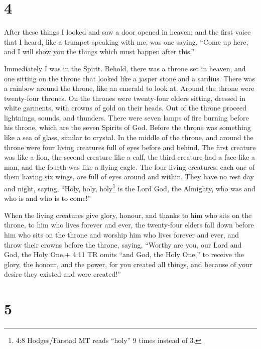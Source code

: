 \hypertarget{section-3}{%
\section{4}\label{section-3}}

 After these things I looked and saw a door opened in
heaven; and the first voice that I heard, like a trumpet speaking with
me, was one saying, ``Come up here, and I will show you the things which
must happen after this.''

 Immediately I was in the Spirit. Behold, there was a throne
set in heaven, and one sitting on the throne  that looked
like a jasper stone and a sardius. There was a rainbow around the
throne, like an emerald to look at.  Around the throne were
twenty-four thrones. On the thrones were twenty-four elders sitting,
dressed in white garments, with crowns of gold on their heads.
 Out of the throne proceed lightnings, sounds, and thunders.
There were seven lamps of fire burning before his throne, which are the
seven Spirits of God.  Before the throne was something like
a sea of glass, similar to crystal. In the middle of the throne, and
around the throne were four living creatures full of eyes before and
behind.  The first creature was like a lion, the second
creature like a calf, the third creature had a face like a man, and the
fourth was like a flying eagle.  The four living creatures,
each one of them having six wings, are full of eyes around and within.
They have no rest day and night, saying, ``Holy, holy, holy\footnote{4:8
  Hodges/Farstad MT reads ``holy'' 9 times instead of 3.} is the Lord
God, the Almighty, who was and who is and who is to come!''

 When the living creatures give glory, honour, and thanks to
him who sits on the throne, to him who lives forever and ever,
 the twenty-four elders fall down before him who sits on
the throne and worship him who lives forever and ever, and throw their
crowns before the throne, saying,  ``Worthy are you, our
Lord and God, the Holy One,+ 4:11 TR omits ``and God, the Holy One,'' to
receive the glory, the honour, and the power, for you created all
things, and because of your desire they existed and were created!''

\hypertarget{section-4}{%
\section{5}\label{section-4}}

